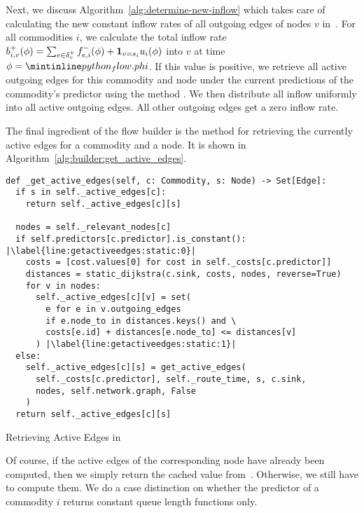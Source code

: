 Next, we discuss Algorithm~\ref{alg:determine-new-inflow} which takes care of calculating the new constant inflow rates of all outgoing edges of nodes $v$ in~.
For all commodities $i$, we calculate the total inflow rate $b_{i,v}^+(\phi) = \sum_{e\in\delta^+_{v}} {f}^-_{e,i}(\phi) + \mathbf{1}_{v=s_i} u_i(\phi)$ into $v$ at time $\phi = \code{_flow.phi}$.
If this value is positive, we retrieve all active outgoing edges for this commodity and node under the current predictions of the commodity's predictor using the method .
We then distribute all inflow uniformly into all active outgoing edges. All other outgoing edges get a zero inflow rate.

The final ingredient of the flow builder is the method  for retrieving the currently active edges for a commodity and a node.
It is shown in Algorithm~\ref{alg:builder:get_active_edges}.
\newcommand{\dist}{\textrm{dist}}

\begin{algorithm}
  \begin{verbatim}
def _get_active_edges(self, c: Commodity, s: Node) -> Set[Edge]:
  if s in self._active_edges[c]:
    return self._active_edges[c][s]

  nodes = self._relevant_nodes[c]
  if self.predictors[c.predictor].is_constant(): |\label{line:getactiveedges:static:0}|
    costs = [cost.values[0] for cost in self._costs[c.predictor]]
    distances = static_dijkstra(c.sink, costs, nodes, reverse=True)
    for v in nodes:
      self._active_edges[c][v] = set(
        e for e in v.outgoing_edges
        if e.node_to in distances.keys() and \
        costs[e.id] + distances[e.node_to] <= distances[v]
      ) |\label{line:getactiveedges:static:1}|
  else:
    self._active_edges[c][s] = get_active_edges(
      self._costs[c.predictor], self._route_time, s, c.sink,
      nodes, self.network.graph, False
    )
  return self._active_edges[c][s]
\end{verbatim}
\caption{Retrieving Active Edges in }
\label{alg:builder:get_active_edges}
\end{algorithm}

Of course, if the active edges of the corresponding node have already been computed, then we simply return the cached value from~.
Otherwise, we still have to compute them.
We do a case distinction on whether the predictor of a commodity $i$ returns constant queue length functions only.


